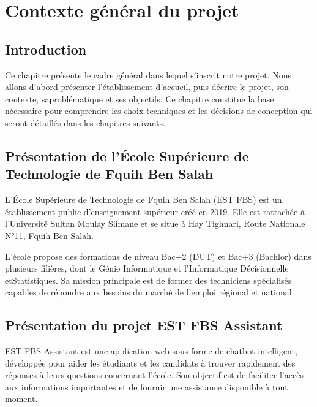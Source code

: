 \documentclass[12pt, a4paper, twoside]{report}
\begin{document}
\chapter{Contexte général du projet}

\section{Introduction}
Ce chapitre présente le cadre général dans lequel s'inscrit notre projet. Nous allons d'abord présenter l'établissement d'accueil, puis décrire le projet, son contexte, sa\newline problématique et ses objectifs. Ce chapitre constitue la base nécessaire pour comprendre les choix techniques et les décisions de conception qui seront détaillés dans les chapitres suivants.


\section{Présentation de l'École Supérieure de Technologie de Fquih Ben Salah}
L'École Supérieure de Technologie de Fquih Ben Salah (EST FBS) est un \newline établissement public d'enseignement supérieur créé en 2019. Elle est rattachée à \newline l'Université Sultan Moulay Slimane et se situe à Hay Tighnari, Route \newline Nationale N°11, Fquih Ben Salah. \newline

L'école propose des formations de niveau Bac+2 (DUT) et Bac+3 (Bachlor) dans \newline plusieurs filières, dont le Génie Informatique et l'Informatique Décisionnelle et\newline Statistiques. Sa mission principale est de former des techniciens spécialisés \newline capables de répondre aux besoins du marché de l'emploi régional et national.
 \newpage

 \section{Présentation du projet EST FBS Assistant}

EST FBS Assistant est une application web sous forme de chatbot intelligent, développée pour aider les étudiants et les candidats à trouver rapidement des réponses à leurs questions concernant l’école. Son objectif est de faciliter l’accès aux informations importantes et de fournir une assistance disponible à tout moment.
\end{document}
